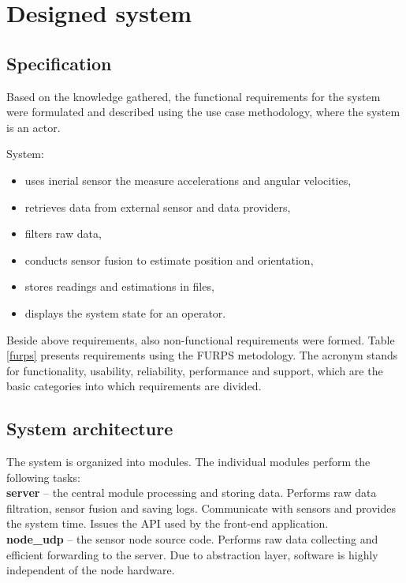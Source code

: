 \chapter{Designed system}

\section{Specification}

Based on the knowledge gathered, the functional requirements for the system were formulated and described using the use case methodology, where the system is an actor.

System:
\begin{itemize}
	\item uses inerial sensor the measure accelerations and angular velocities,
	\item retrieves data from external sensor and data providers,
	\item filters raw data,
	\item conducts sensor fusion to estimate position and orientation,
	\item stores readings and estimations in files,
	\item displays the system state for an operator.
\end{itemize}

Beside above requirements, also non-functional requirements were formed. Table \ref{furps} presents requirements using the FURPS metodology. The acronym stands for functionality, usability, reliability, performance and support, which are the basic categories into which requirements are divided. \cite{watson2006managing}

\section{System architecture}

The system is organized into modules. The individual modules perform the following tasks:\\

\noindent\textbf{server} -- the central module processing and storing data. Performs raw data filtration, sensor fusion and saving logs. Communicate with sensors and provides the system time. Issues the API used by the front-end application.\\

\noindent\textbf{node\_udp} -- the sensor node source code. Performs raw data collecting and efficient forwarding to the server. Due to abstraction layer, software is highly independent of the node hardware.\\

